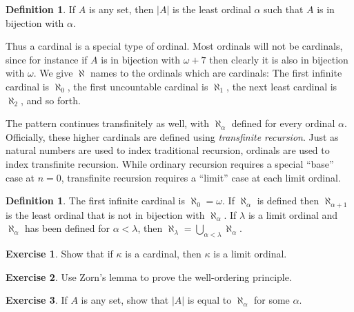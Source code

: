 \documentclass[11pt,oneside]{amsart}
\theoremstyle{definition}
\newtheorem{exerc}{Exercise}[section]
\theoremstyle{definition}
\newtheorem{defn}[thm]{Definition}
\theoremstyle{remark}
\begin{document}
\begin{defn}
  If $A$ is any set, then $|A|$ is the least ordinal $\alpha$ such that $A$ is in bijection with $\alpha$.
\end{defn}

Thus a cardinal is a special type of ordinal. Most ordinals will not be cardinals, since for instance if $A$ is in bijection with $\omega+7$ then clearly it is also in bijection with $\omega$. We give $\aleph$ names to the ordinals which are cardinals: The first infinite cardinal is $\aleph_0$, the first uncountable cardinal is $\aleph_1$, the next least cardinal is $\aleph_2$, and so forth.

The pattern continues transfinitely as well, with $\aleph_\alpha$ defined for every ordinal $\alpha$. Officially, these higher cardinals are defined using \emph{transfinite recursion}. Just as natural numbers are used to index traditional recursion, ordinals are used to index transfinite recursion. While ordinary recursion requires a special ``base'' case at $n=0$, transfinite recursion requires a ``limit'' case at each limit ordinal.

\begin{defn}
  The first infinite cardinal is $\aleph_0=\omega$. If $\aleph_\alpha$ is defined then $\aleph_{\alpha+1}$ is the least ordinal that is not in bijection with $\aleph_\alpha$. If $\lambda$ is a limit ordinal and $\aleph_\alpha$ has been defined for $\alpha<\lambda$, then $\aleph_\lambda=\bigcup_{\alpha<\lambda}\aleph_\alpha$.
\end{defn}


\begin{exerc}
  Show that if $\kappa$ is a cardinal, then $\kappa$ is a limit ordinal.
\end{exerc}

\begin{exerc}
  Use Zorn's lemma to prove the well-ordering principle.
\end{exerc}

\begin{exerc}
  If $A$ is any set, show that $|A|$ is equal to $\aleph_\alpha$ for some $\alpha$.
\end{exerc}


\end{document}
